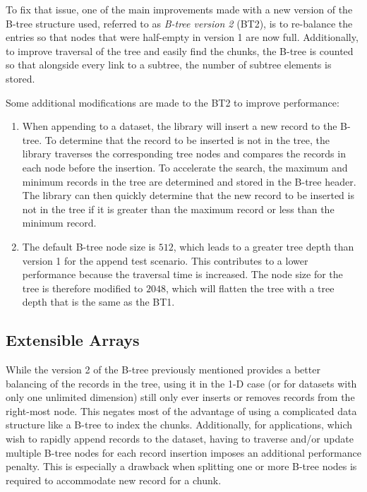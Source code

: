 To fix that issue, one of the main improvements made with a new version of
the B-tree structure used, referred to as \textit{B-tree version 2} (BT2), is to
re-balance the entries so that nodes that were half-empty in version 1 are
now full. Additionally, to improve traversal of the tree and easily find the
chunks, the B-tree is counted so that alongside every link to a subtree, the
number of subtree elements is stored.

Some additional modifications are made to the BT2 to improve performance:
\begin{enumerate}
\item
When appending to a dataset, the library will insert a new record to the
B-tree. To determine that the record to be inserted is not in the tree,
the library traverses the corresponding tree nodes and compares the records 
in each node before the insertion.
To accelerate the search, the maximum and minimum records in the tree are 
determined and stored in the B-tree header. The library can then quickly 
determine that the new record to be inserted is not in the tree if it is 
greater than the maximum record or less than the minimum record.
\item
The default B-tree node size is $512$, which leads to a greater tree depth
than version 1 for the append test scenario. This contributes to a lower
performance because the traversal time is increased. The node size for the
tree is therefore modified to $2048$, which will flatten the tree with a tree 
depth that is the same as the BT1.
\end{enumerate}

\subsection{Extensible Arrays}

While the version 2 of the B-tree previously mentioned provides a better
balancing of the records in the tree, using it in the 1-D case (or for
datasets with only one unlimited dimension) still only ever inserts or removes
records from the right-most node.
This negates most of the advantage of using a complicated data structure like a
B-tree to index the chunks.
Additionally, for applications, which wish to rapidly append records to the 
dataset, having to traverse and/or update multiple B-tree nodes for each 
record insertion imposes an additional performance penalty. This is 
especially a drawback when splitting one or more B-tree nodes is required to 
accommodate new record for a chunk.

